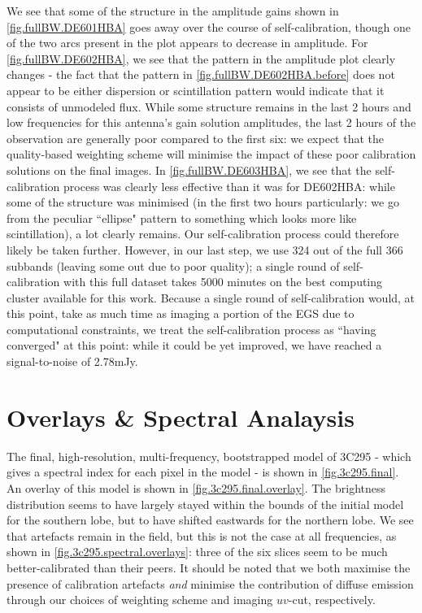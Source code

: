 \pg
We see that some of the structure in the amplitude gains shown in \cref{fig.fullBW.DE601HBA} goes away over the course of self-calibration, though one of the two arcs present in the plot appears to decrease in amplitude. For \cref{fig.fullBW.DE602HBA}, we see that the pattern in the amplitude plot clearly changes - the fact that the pattern in \cref{fig.fullBW.DE602HBA.before} does not appear to be either dispersion or scintillation pattern would indicate that it consists of unmodeled flux. While some structure remains in the last 2 hours and low frequencies for this antenna's gain solution amplitudes, the last 2 hours of the observation are generally poor compared to the first six: we expect that the quality-based weighting scheme will minimise the impact of these poor calibration solutions on the final images. In \cref{fig.fullBW.DE603HBA}, we see that the self-calibration process was clearly less effective than it was for DE602HBA: while some of the structure was minimised (in the first two hours particularly: we go from the peculiar ``ellipse" pattern to something which looks more like scintillation), a lot clearly remains. Our self-calibration process could therefore likely be taken further. However, in our last step, we use 324 out of the full 366 subbands (leaving some out due to poor quality); a single round of self-calibration with this full dataset takes 5000 minutes on the best computing cluster available for this work. Because a single round of self-calibration would, at this point, take as much time as imaging a portion of the EGS due to computational constraints, we treat the self-calibration process as ``having converged" at this point: while it could be yet improved, we have reached a signal-to-noise of 2.78mJy. 


\clearpage
\section{Overlays \& Spectral Analaysis}

\pg
The final, high-resolution, multi-frequency, bootstrapped model of 3C295 - which gives a spectral index for each pixel in the model - is shown in \cref{fig.3c295.final}. An overlay of this model is shown in \cref{fig.3c295.final.overlay}. The brightness distribution seems to have largely stayed within the bounds of the initial model for the southern lobe, but to have shifted eastwards for the northern lobe. We see that artefacts remain in the field, but this is not the case at all frequencies, as shown in \cref{fig.3c295.spectral.overlays}: three of the six slices seem to be much better-calibrated than their peers. It should be noted that we both maximise the presence of calibration artefacts \textit{and} minimise the contribution of diffuse emission through our choices of weighting scheme and imaging $uv$-cut, respectively.

